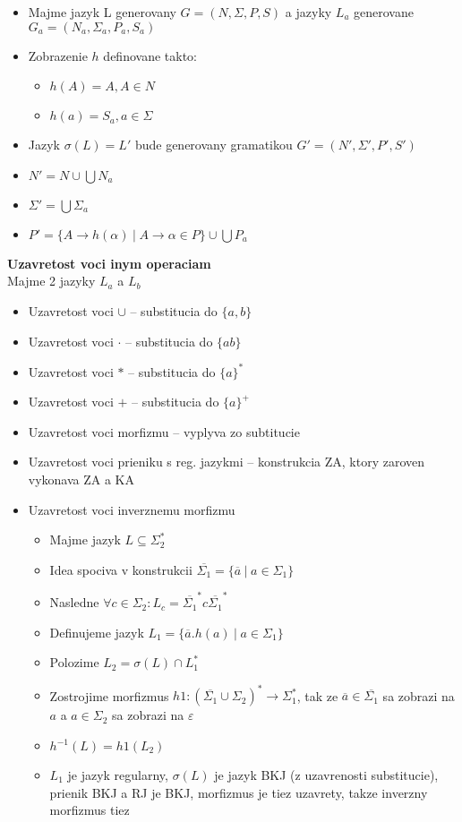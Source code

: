 \documentclass[12pt]{article}
\newcommand{\pipesep}{\hspace{3pt} \vert \hspace{3pt}}
\begin{document}
\begin{itemize}
	\item Majme jazyk L generovany $G = (N,\Sigma,P,S)$ a jazyky $L_{a}$ generovane $G_{a} = (N_{a}, \Sigma_{a}, P_{a}, S_{a})$
	\item Zobrazenie $h$ definovane takto:
		\begin{itemize}
			\item $h(A) = A, A \in N$
			\item $h(a) = S_{a}, a \in \Sigma$
		\end{itemize}
	\item Jazyk $\sigma(L) = L'$ bude generovany gramatikou $G'=(N',\Sigma',P',S')$
	\item $N' = N \cup \bigcup N_{a}$
	\item $\Sigma' = \bigcup \Sigma_{a}$
	\item $P' = \{A \to h(\alpha) \pipesep A \to \alpha \in P\} \cup \bigcup P_{a}$
\end{itemize}

\textbf{Uzavretost voci inym operaciam} \\
Majme 2 jazyky $L_{a}$ a $L_{b}$
\begin{itemize}
	\item Uzavretost voci $\cup$ -- substitucia do $\{a,b\}$
	\item Uzavretost voci $\cdot$ -- substitucia do $\{ab\}$
	\item Uzavretost voci $*$ -- substitucia do $\{a\}^{*}$
	\item Uzavretost voci $+$ -- substitucia do $\{a\}^{+}$
	\item Uzavretost voci morfizmu -- vyplyva zo subtitucie
	\item Uzavretost voci prieniku s reg. jazykmi -- konstrukcia ZA, ktory zaroven vykonava ZA a KA
	\item Uzavretost voci inverznemu morfizmu
		\begin{itemize}
			\item Majme jazyk $L \subseteq \Sigma_{2}^{*}$
			\item Idea spociva v konstrukcii $\overline{\Sigma_{1}} = \{\overline{a} \pipesep a \in \Sigma_{1}\}$
			\item Nasledne $\forall c \in \Sigma_{2}: L_{c} = \overline{\Sigma_{1}}^{*}c\overline{\Sigma_{1}}^{*}$
			\item Definujeme jazyk $L_{1} = \{\overline{a}.h(a) \pipesep a \in \Sigma_{1}\}$
			\item Polozime $L_{2} = \sigma(L) \cap L_{1}^{*}$
			\item Zostrojime morfizmus $h1: (\overline{\Sigma_{1}} \cup \Sigma_{2})^{*} \to \Sigma_{1}^{*}$, tak ze $\overline{a}\in \overline{\Sigma_{1}}$ sa zobrazi na $a$ a
				$a \in \Sigma_{2}$ sa zobrazi na $\varepsilon$
			\item $h^{-1}(L) = h1(L_{2})$
			\item $L_{1}$ je jazyk regularny, $\sigma(L)$ je jazyk BKJ (z uzavrenosti substitucie), prienik BKJ a RJ je BKJ, morfizmus je tiez uzavrety, takze inverzny morfizmus tiez
		\end{itemize}
\end{itemize}
\end{document}
